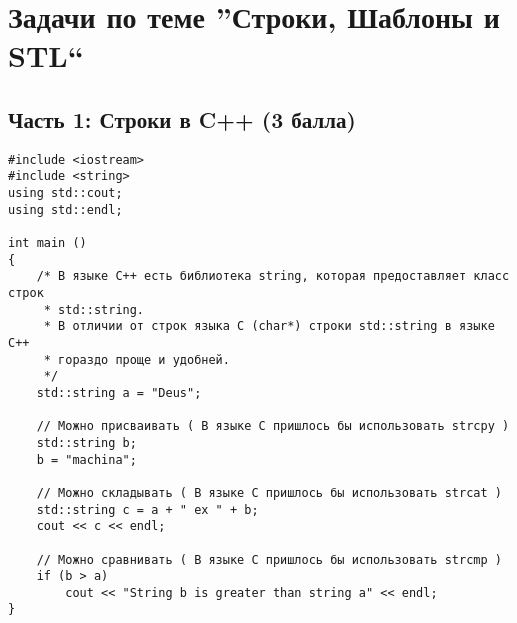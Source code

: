 \documentclass{article}
\begin{document}



\section*{Задачи по теме ''Строки, Шаблоны и STL``}
\subsection*{Часть 1: Строки в C++ (3 балла)}
\begin{lstlisting}
#include <iostream>
#include <string> 
using std::cout;
using std::endl;

int main () 
{
    /* В языке C++ есть библиотека string, которая предоставляет класс строк
     * std::string.
     * В отличии от строк языка C (char*) строки std::string в языке C++
     * гораздо проще и удобней.
     */
    std::string a = "Deus";
    
    // Можно присваивать ( В языке C пришлось бы использовать strcpy )
    std::string b;
    b = "machina";
	
    // Можно складывать ( В языке C пришлось бы использовать strcat )
    std::string c = a + " ex " + b;
    cout << c << endl;
    
    // Можно сравнивать ( В языке C пришлось бы использовать strcmp )
    if (b > a)
        cout << "String b is greater than string a" << endl;
}

\end{lstlisting}
\end{document}
